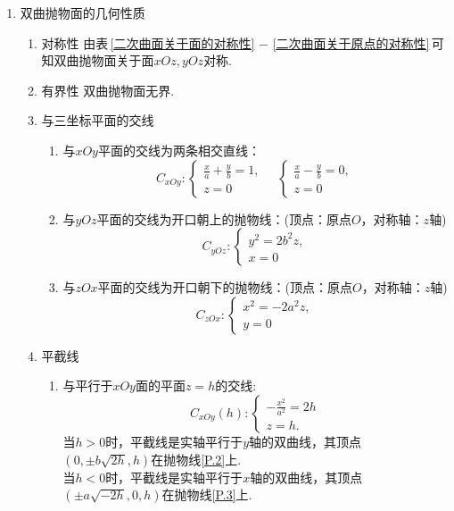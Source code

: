 \begin{enumerate}
\item 双曲抛物面的几何性质
		\begin{enumerate}
	\setlength{\topsep}{0.01em}
	\setlength{\itemsep}{0.01em}
	
	\item 对称性 \kg 由表$\,$\ref{二次曲面关于面的对称性}  $-$ \ref{二次曲面关于原点的对称性}$\,$可知双曲抛物面关于面$xOz,yOz$对称.
	
	\item 有界性 \kg 双曲抛物面无界.
	
		\item 与三坐标平面的交线

\begin{enumerate}
	\setlength{\topsep}{0.01em}
	\setlength{\itemsep}{0.01em}
	\item 与$xOy$平面的交线为两条相交直线：
	\begin{equation}
	C_{xOy}:
	\begin{cases}
	\displaystyle \frac{x}{a}+\frac{y}{b}=1,\\
	z=0
	\end{cases}
	\quad
	\begin{cases}
	\frac{x}{a}-\frac{y}{b}=0,\\
	z=0
	\end{cases}
	\end{equation}
	
	\item 与$yOz$平面的交线为开口朝上的抛物线：(顶点：原点$O$，对称轴：$z$轴)
	\begin{equation}
	C_{yOz}:
	\begin{cases}
	y^2=2b^2z,\\
	x=0
	\end{cases}
	\label{P.2}
	\end{equation}
	
	\item 与$zOx$平面的交线为开口朝下的抛物线：(顶点：原点$O$，对称轴：$z$轴)
	\begin{equation}
	C_{zOx}:
	\begin{cases}
	x^2=-2a^2z,\\
	y=0
	\end{cases}
	\label{P.3}
	\end{equation}
\end{enumerate}

\item 平截线
		\begin{enumerate}
			\setlength{\topsep}{0.01em}
			\setlength{\itemsep}{0.01em}
			\item 与平行于$ xOy $面的平面$z = h$的交线:
			\begin{equation}
			C_{xOy}(h):
			\begin{cases}
			\displaystyle -\frac{x^2}{a^2}=2h\\
			z=h.
			\end{cases}
			\end{equation}
			\kg 当$h>0$时，平截线是实轴平行于$y$轴的双曲线，其顶点$(0,\pm b\sqrt{2h},h)$在抛物线\eqref{P.2}上.\\
			\kg 当$h<0$时，平截线是实轴平行于$x$轴的双曲线，其顶点$(\pm a\sqrt{-2h},0,h)$在抛物线\eqref{P.3}上.
			

\end{enumerate}
\end{enumerate}
\end{enumerate}
